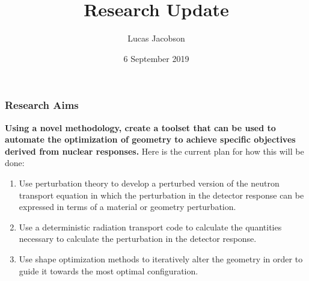 \documentclass[t]{beamer}
\title{Research Update}
\author{Lucas Jacobson}
\institute{University of Wisconsin--Madison}
\date{6 September 2019}
\begin{document}

\begin{frame}
  \titlepage
\end{frame}


\begin{frame}
  \frametitle{Research Aims}
  \textbf{Using a novel methodology, create a toolset that can be used to
  automate the optimization of geometry to achieve specific objectives derived
  from nuclear responses.}
  \newline\newline
  Here is the current plan for how this will be done:
  \begin{enumerate}[1]
    \item Use perturbation theory to develop a perturbed version of the neutron
          transport equation in which the perturbation in the detector response
          can be expressed in terms of a material or geometry perturbation.
    \item Use a deterministic radiation transport code to calculate the
          quantities necessary to calculate the perturbation in the detector
          response.
    \item Use shape optimization methods to iteratively alter the geometry in
          order to guide it towards the most optimal configuration.
  \end{enumerate}
\end{frame}

\end{document}
